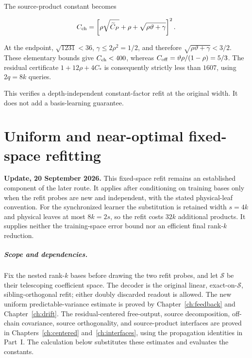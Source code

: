 \documentclass[11pt,oneside,openany,a4paper]{book}
\numberwithin{equation}{chapter}
\theoremstyle{definition}
\theoremstyle{remark}
\newcommand{\F}[1]{\left\lVert#1\right\rVert_F}
\begin{document}
The source-product constant becomes

\[
C_{\rm ch}=
\left[\rho\sqrt{\widetilde C_P}
      +\rho+\sqrt{\rho\vartheta+\gamma}\right]^2.
\]

At the endpoint, \(\sqrt{1231}<36\), \(\gamma\le2\rho^2=1/2\), and therefore \(\sqrt{\rho\vartheta+\gamma}<3/2\). These elementary bounds give \(C_{\rm ch}<400\), whereas \(C_{\rm off}=\vartheta\rho/(1-\rho)=5/3\). The residual certificate \(1+12\rho+4C_*\) is consequently strictly less than \(1607\), using \(2q=8k\) queries.

This verifies a depth-independent constant-factor refit at the original width. It does not add a basis-learning guarantee.

\endgroup

\begingroup
\let\E\relax
\newcommand{\E}{\mathbb E}
\let\F\relax
\newcommand{\F}[1]{\lVert#1\rVert_F}
\chapter{Uniform and near-optimal fixed-space refitting}\label{ch:uniform}
\begin{scopebox}
\textbf{Update, 20 September 2026.} This fixed-space refit remains an established component of the later route. It applies after conditioning on training bases only when the refit probes are new and independent, with the stated physical-leaf convention. For the synchronized learner the substitution is retained width $s=4k$ and physical leaves at most $8k=2s$, so the refit costs $32k$ additional products. It supplies neither the training-space error bound nor an efficient final rank-$k$ reduction.
\end{scopebox}

\paragraph{Scope and dependencies.}
Fix the nested rank-$k$ bases before drawing the two refit probes,
and let $\mathcal S$ be their telescoping coefficient space.
The decoder is the original linear, exact-on-$\mathcal S$,
sibling-orthogonal refit; either doubly discarded readout is allowed.
The new uniform predictable-variance estimate is proved by
Chapter~\ref{ch:feedback} and
Chapter~\ref{ch:drift}.
The residual-centered free-output, source decomposition, off-chain
covariance, source orthogonality, and source-product interfaces are
proved in Chapters~\ref{ch:centered} and~\ref{ch:interfaces}, using the propagation identities in Part~I. The calculation below substitutes these estimates and evaluates the constants.
\end{document}
